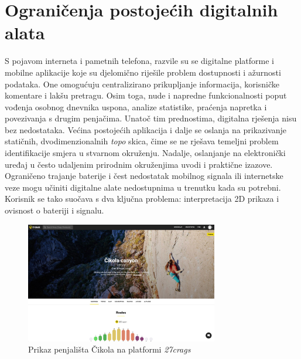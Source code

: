 \section{Ograničenja postojećih digitalnih alata}

S pojavom interneta i pametnih telefona, razvile su se digitalne platforme i mobilne aplikacije koje su djelomično riješile problem dostupnosti i ažurnosti podataka. One omogućuju centralizirano prikupljanje informacija, korisničke komentare i lakšu pretragu. Osim toga, nude i napredne funkcionalnosti poput vođenja osobnog dnevnika uspona, analize statistike, praćenja napretka i povezivanja s drugim penjačima.
Unatoč tim prednostima, digitalna rješenja nisu bez nedostataka. Većina postojećih aplikacija i dalje se oslanja na prikazivanje statičnih, dvodimenzionalnih \textit{topo} skica, čime se ne rješava temeljni problem identifikacije smjera u stvarnom okruženju. Nadalje, oslanjanje na elektronički uređaj u često udaljenim prirodnim okruženjima uvodi i praktične izazove. Ograničeno trajanje baterije i čest nedostatak mobilnog signala ili internetske veze mogu učiniti digitalne alate nedostupnima u trenutku kada su potrebni. Korisnik se tako suočava s dva ključna problema: interpretacija 2D prikaza i ovisnost o bateriji i signalu.

\begin{figure}[H]
    \centering
    \includegraphics[width=0.75\textwidth]{images/uvod/27crags_cikola.jpeg}
    \caption{Prikaz penjališta Čikola na platformi \textit{27crags}}
\end{figure}
